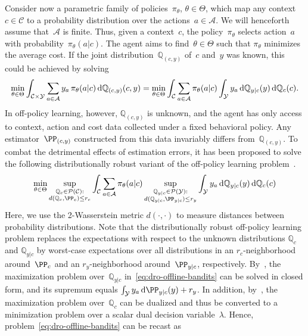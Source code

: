 \documentclass[11pt]{article}
\begin{document}
    Consider now a parametric family of policies~$\pi_\theta$, $\theta\in\Theta$, which map any context~$c\in\mathcal C$ to a probability distribution over the actions~$a\in\mathcal A$. We will henceforth assume that~$\mathcal A$ is finite. Thus, given a context~$c$, the policy~$\pi_\theta$ selects action~$a$ with probability~$\pi_\theta(a|c)$. The agent aims to find~$\theta\in\Theta$ such that $\pi_\theta$ minimizes the average cost. If the joint distribution~$\mathbb Q_{(c,y)}$ of~$c$ and~$y$ was known, this could be achieved by solving
    \begin{align*}
        \min_{\theta\in\Theta} \int_{\mathcal C\times\mathcal Y} \sum_{a\in\mathcal A} y_a \, \pi_\theta(a|c) \, {\rm d}\mathbb Q_{(c,y)}(c,y) = \min_{\theta\in\Theta} \int_{\mathcal C} \sum_{a\in\mathcal A} \pi_\theta(a|c) \int_{\mathcal Y} y_a \,{\rm d}\mathbb Q_{y|c}(y) \, {\rm d}\mathbb Q_{c}(c).
    \end{align*}
    In off-policy learning, however, $\mathbb Q_{(c,y)}$ is unknown, and the agent has only access to context, action and cost data collected under a fixed behavioral policy. Any estimator~$\PP_{(c,y)}$ constructed from this data invariably differs from~$\mathbb Q_{(c,y)}$. To combat the detrimental effects of estimation errors, it has been proposed to solve the following distributionally robust variant of the off-policy learning problem~\citep{shen2024wasserstein}.
    \begin{align}
        \label{eq:dro-offline-bandits}
        \min_{\theta\in\Theta} \sup_{\substack{\mathbb Q_c\in\mathcal P(\mathcal C): \\ d(\mathbb Q_c,\PP_c)\leq r_c}} \int_{\mathcal C} \sum_{a\in\mathcal A} \pi_\theta(a|c) \sup_{\substack{\mathbb Q_{y|c}\in\mathcal P(\mathcal Y): \\ d(\mathbb Q_ {y|c},\PP_{y|c})\leq r_y}} \int_{\mathcal Y} y_a \,{\rm d}\mathbb Q_{y|c}(y) \, {\rm d}\mathbb Q_{c}(c)
    \end{align}
    Here, we use the 2-Wasserstein metric $d(\cdot,\cdot)$ to measure distances between probability distributions. Note that the distributionally robust off-policy learning problem replaces the expectations with respect to the unknown distributions $\mathbb Q_c$ and $\mathbb Q_{y|c}$ by worst-case expectations over all distributions in an $r_c$-neighborhood around~$\PP_c$ and an $r_y$-neighborhood around~$\PP_{y|c}$, respectively. By~\cite[Proposition~6.20]{kuhn2024distributionally}, the maximization problem over~$\mathbb Q_{y|c}$ in~\eqref{eq:dro-offline-bandits} can be solved in closed form, and its supremum equals $\int_{\mathcal Y} y_a\, {\rm d} \PP_{y|c}(y) +r_y$. In addition, by~\cite[Theorem~4.18]{kuhn2024distributionally}, the maximization problem over~$\mathbb Q_c$ can be dualized and thus be converted to a minimization problem over a scalar dual decision variable~$\lambda$. Hence, problem~\eqref{eq:dro-offline-bandits} can be recast as
\end{document}
